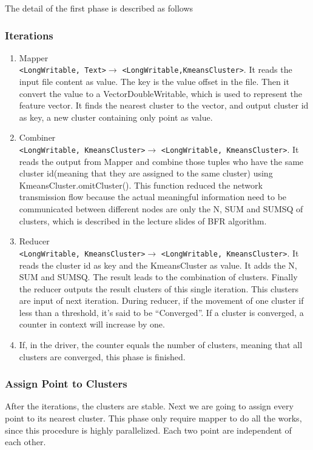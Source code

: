 \documentclass[a4paper,11pt]{article}
\begin{document}
The detail of the first phase is described as follows
\subsubsection{Iterations}
\begin{enumerate}
  \item Mapper\\\verb|<LongWritable, Text>|$\rightarrow$
  \verb|<LongWritable,KmeansCluster>|. It reads the input file content as value.
  The key is the value offset in the file. Then it convert the value to a
  VectorDoubleWritable, which is used to represent the feature vector. It finds
  the nearest cluster to the vector, and output cluster id as key, a new cluster
  containing only point as value.
  \item Combiner\\\verb|<LongWritable, KmeansCluster>|$\rightarrow$
  \verb|<LongWritable, KmeansCluster>|. It reads the output from Mapper and
  combine those tuples who have the same cluster id(meaning that they are
  assigned to the same cluster) using KmeansCluster.omitCluster(). This function
  reduced the network transmission flow because the actual meaningful
  information need to be communicated between different nodes are only the N,
  SUM and SUMSQ of clusters, which is described in the lecture slides of BFR algorithm.
  \item Reducer\\\verb|<LongWritable, KmeansCluster>|$\rightarrow$
  \verb|<LongWritable, KmeansCluster>|. It reads the cluster id as key and the
  KmeansCluster as value. It adds the N, SUM and SUMSQ. The result leads to the
  combination of clusters. Finally the reducer outputs the result clusters of
  this single iteration. This clusters are input of next iteration. During
  reducer, if the movement of one cluster if less than a threshold, it's said
  to be ``Converged''. If a cluster is converged, a counter in context will
  increase by one.
  \item If, in the driver, the counter equals the number of clusters, meaning
  that all clusters are converged, this phase is finished.
\end{enumerate} 
\subsubsection{Assign Point to Clusters}
After the iterations, the clusters are stable. Next we are going to assign every
point to its nearest cluster. This phase only require mapper to do all the
works, since this procedure is highly parallelized. Each two point are
independent of each other.
\end{document}
